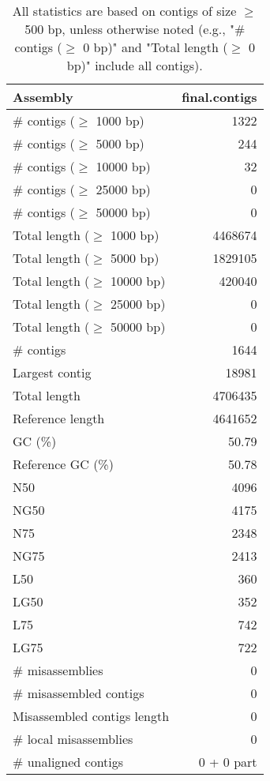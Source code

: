 \documentclass[12pt,a4paper]{article}
\begin{document}
\begin{table}[ht]
\begin{center}
\caption{All statistics are based on contigs of size $\geq$ 500 bp, unless otherwise noted (e.g., "\# contigs ($\geq$ 0 bp)" and "Total length ($\geq$ 0 bp)" include all contigs).}
\begin{tabular}{|l*{1}{|r}|}
\hline
Assembly & final.contigs \\ \hline
\# contigs ($\geq$ 1000 bp) & 1322 \\ \hline
\# contigs ($\geq$ 5000 bp) & 244 \\ \hline
\# contigs ($\geq$ 10000 bp) & 32 \\ \hline
\# contigs ($\geq$ 25000 bp) & 0 \\ \hline
\# contigs ($\geq$ 50000 bp) & 0 \\ \hline
Total length ($\geq$ 1000 bp) & 4468674 \\ \hline
Total length ($\geq$ 5000 bp) & 1829105 \\ \hline
Total length ($\geq$ 10000 bp) & 420040 \\ \hline
Total length ($\geq$ 25000 bp) & 0 \\ \hline
Total length ($\geq$ 50000 bp) & 0 \\ \hline
\# contigs & 1644 \\ \hline
Largest contig & 18981 \\ \hline
Total length & 4706435 \\ \hline
Reference length & 4641652 \\ \hline
GC (\%) & 50.79 \\ \hline
Reference GC (\%) & 50.78 \\ \hline
N50 & 4096 \\ \hline
NG50 & 4175 \\ \hline
N75 & 2348 \\ \hline
NG75 & 2413 \\ \hline
L50 & 360 \\ \hline
LG50 & 352 \\ \hline
L75 & 742 \\ \hline
LG75 & 722 \\ \hline
\# misassemblies & 0 \\ \hline
\# misassembled contigs & 0 \\ \hline
Misassembled contigs length & 0 \\ \hline
\# local misassemblies & 0 \\ \hline
\# unaligned contigs & 0 + 0 part \\ \hline

\end{tabular}
\end{center}
\end{table}
\end{document}
